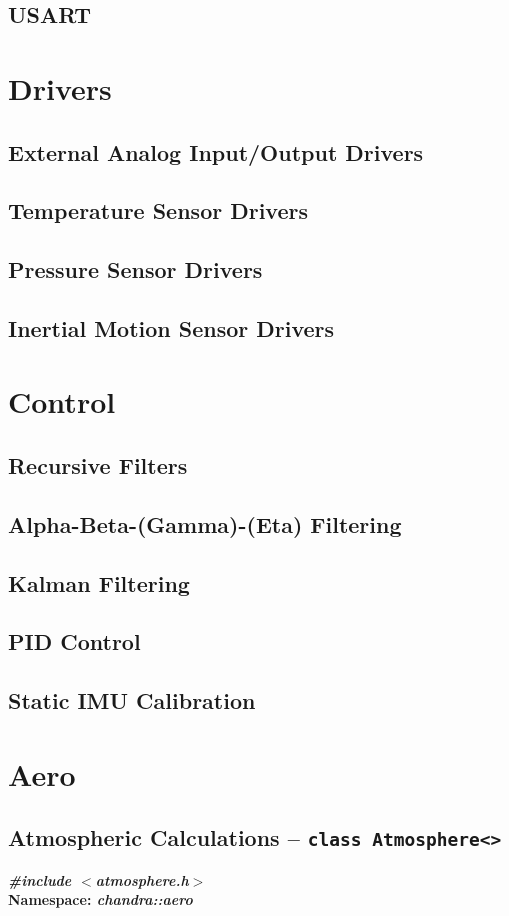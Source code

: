 \documentclass[10pt,letterpaper]{memoir} %
\newcommand{\apiheader}[2]{\noindent{}\textbf{\emph{\#include $<$#1$>$}}\\\noindent{}\textbf{Namespace: \emph{#2}}}
\begin{document}
\section{USART}

\chapter{Drivers}
\section{External Analog Input/Output Drivers}
\section{Temperature Sensor Drivers}
\section{Pressure Sensor Drivers}
\section{Inertial Motion Sensor Drivers}

\chapter{Control}
\section{Recursive Filters}
\section{Alpha-Beta-(Gamma)-(Eta) Filtering}
\section{Kalman Filtering}
\section{PID Control}
\section{Static IMU Calibration}

\chapter{Aero}
\section{Atmospheric Calculations -- \texttt{class Atmosphere<>}}
\label{sec:atmosphere:calculation:api}
\apiheader{atmosphere.h}{chandra::aero}
\end{document}
